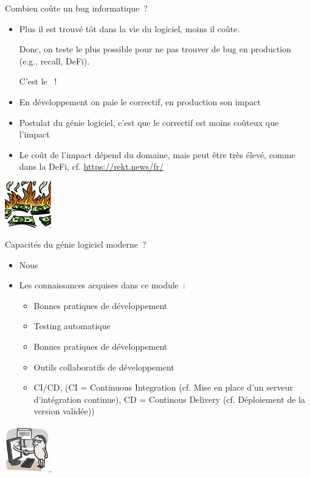 \documentclass{beamer}
\begin{document}
    \begin{frame}{Combien coûte un bug informatique~?}
        \begin{itemize}
            \item Plus il est trouvé tôt dans la vie du logiciel, moins il coûte.

            Donc, on teste le plus possible pour ne pas trouver de bug en production (e.g., recall, DeFi).

            C'est le ~!
            \item En développement on paie le correctif, en production son impact
            \item Postulat du génie logiciel, c'est que le correctif est moins coûteux que l'impact
            \item Le coût de l'impact dépend du domaine, mais peut être très élevé, comme dans la DeFi, cf. \url{https://rekt.news/fr/}
        \end{itemize}
        \bigbreak
        \centering
        \includegraphics[width=2cm]{image/milions-of-dolar-bills-burning}
    \end{frame}

    \begin{frame}{Capacités du génie logiciel moderne~?}
        \begin{itemize}
            \item Nous

            \item Les connaissances acquises dans ce module~:

            \begin{itemize}
                \item Bonnes pratiques de développement
                \item Testing automatique
                \item Bonnes pratiques de développement
                \item Outils collaboratifs de développement
                \item CI/CD, (CI = Continuous Integration (cf. Mise en place d'un serveur d'intégration continue), CD = Continous Delivery (cf. Déploiement de la version validée))
            \end{itemize}
        \end{itemize}
        \bigbreak
        \centering
        \includegraphics[width=2cm]{image/programmer-shaking-hand-with-computer}
    \end{frame}
\end{document}
